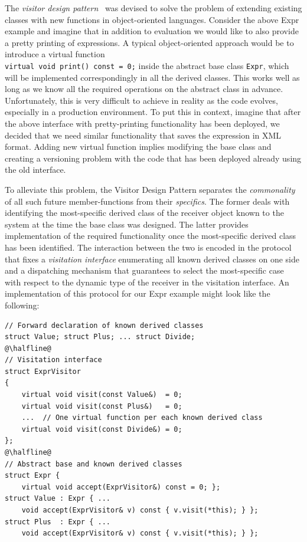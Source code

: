\documentclass[preprint]{sigplanconf}
\makeatletter
\DeclareRobustCommand{\code}[1]{{\lstinline[breaklines=false,escapechar=@]{#1}}}
\makeatother
\begin{document}
The \emph{visitor design pattern}~\cite{DesignPatterns1993} was devised to solve the problem 
of extending existing classes with new functions in object-oriented languages. 
Consider the above Expr example and imagine that in addition to evaluation we would like to also provide a pretty 
printing of expressions. A typical object-oriented approach would be to 
introduce a virtual function \\ \code{virtual void print() const = 0;} inside 
the abstract base class \code{Expr}, which will be implemented correspondingly 
in all the derived classes. This works well as long as we know all the required  
operations on the abstract class in advance. Unfortunately, this is very 
difficult to achieve in reality as the code evolves, especially in a production 
environment. To put this in context, imagine that after the above interface with 
pretty-printing functionality has been deployed, we decided that we need 
similar functionality that saves the expression in XML format. Adding new 
virtual function implies modifying the base class and creating a versioning 
problem with the code that has been deployed already using the old interface.

To alleviate this problem, the Visitor Design Pattern separates the 
\emph{commonality} of all such future member-functions from their 
\emph{specifics}. The former deals with identifying the most-specific derived 
class of the receiver object known to the system at the time the base class was 
designed. The latter provides implementation of the required functionality once 
the most-specific derived class has been identified. The interaction between the 
two is encoded in the protocol that fixes a \emph{visitation interface} 
enumerating all known derived classes on one side and a dispatching mechanism 
that guarantees to select the most-specific case with respect to the dynamic 
type of the receiver in the visitation interface. An implementation of this 
protocol for our Expr example might look like the following:

\begin{lstlisting}
// Forward declaration of known derived classes
struct Value; struct Plus; ... struct Divide;
@\halfline@
// Visitation interface
struct ExprVisitor
{
    virtual void visit(const Value&)  = 0;
    virtual void visit(const Plus&)   = 0;
    ...  // One virtual function per each known derived class
    virtual void visit(const Divide&) = 0;
};
@\halfline@
// Abstract base and known derived classes
struct Expr { 
    virtual void accept(ExprVisitor&) const = 0; };
struct Value : Expr { ...
    void accept(ExprVisitor& v) const { v.visit(*this); } };
struct Plus  : Expr { ...
    void accept(ExprVisitor& v) const { v.visit(*this); } };
\end{lstlisting}
\end{document}

